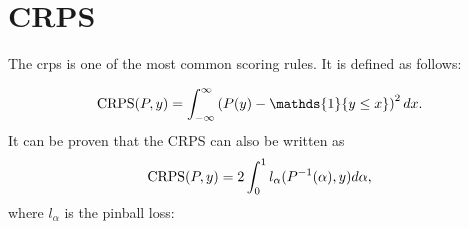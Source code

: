 \section{CRPS}
\label{ch:crps}

The \gls{crps} is one of the most common 
scoring rules. It is defined as follows: 

\[ \CRPS(P, y) = \int_{-\infty}^\infty \left( P(y) - \mathds{1} \{y \leq x\} \right)^2 dx. \]
It can be proven that the CRPS can also be written as 
\[ \operatorname{CRPS}(P, y) = 2 \int_0^1 l_\alpha(P^{-1}(\alpha), y) d\alpha, \]
where \(l_\alpha\) is the pinball loss: 
